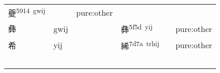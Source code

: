 \documentclass[14pt,a4paper]{scrartcl}
\begin{document}
\begin{longtable}[c]{@{}llllll@{}}
\begin{minipage}[t]{0.14\columnwidth}
夔\textsuperscript{5914~gwij}
\strut\end{minipage} &
\begin{minipage}[t]{0.14\columnwidth}\raggedright\strut
\strut\end{minipage} &
\begin{minipage}[t]{0.14\columnwidth}\raggedright\strut
pure:other
\strut\end{minipage}\tabularnewline
\begin{minipage}[t]{0.14\columnwidth}\raggedright\strut
彝
\strut\end{minipage} &
\begin{minipage}[t]{0.14\columnwidth}\raggedright\strut
gwij
\strut\end{minipage} &
\begin{minipage}[t]{0.14\columnwidth}\raggedright\strut
\strut\end{minipage} &
\begin{minipage}[t]{0.14\columnwidth}\raggedright\strut
彝\textsuperscript{5f5d~yij}
\strut\end{minipage} &
\begin{minipage}[t]{0.14\columnwidth}\raggedright\strut
\strut\end{minipage} &
\begin{minipage}[t]{0.14\columnwidth}\raggedright\strut
pure:other
\strut\end{minipage}\tabularnewline
\begin{minipage}[t]{0.14\columnwidth}\raggedright\strut
希
\strut\end{minipage} &
\begin{minipage}[t]{0.14\columnwidth}\raggedright\strut
yij
\strut\end{minipage} &
\begin{minipage}[t]{0.14\columnwidth}\raggedright\strut
\strut\end{minipage} &
\begin{minipage}[t]{0.14\columnwidth}\raggedright\strut
絺\textsuperscript{7d7a~trhij}
\strut\end{minipage} &
\begin{minipage}[t]{0.14\columnwidth}\raggedright\strut
\strut\end{minipage} &
\begin{minipage}[t]{0.14\columnwidth}\raggedright\strut
pure:other
\strut\end{minipage}\tabularnewline
\begin{minipage}[t]{0.14\columnwidth}\raggedright\strut
𠩺
\strut\end{minipage} &

\end{longtable}
\end{document}
